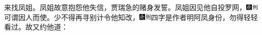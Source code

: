 来找凤姐。凤姐故意抱怨他失信，贾瑞急的赌身发誓。凤姐因见他自投罗网，{\includegraphics[width=3mm]{../Images/00004}\includegraphics[width=3mm]{../Images/00011}\footnotesize \kaishu 可谓因人而使。}少不得再寻别计令他知改，{\includegraphics[width=3mm]{../Images/00004}\includegraphics[width=3mm]{../Images/00011}\footnotesize \kaishu 四字是作者明阿凤身份，勿得轻轻看过。}故又约他道：